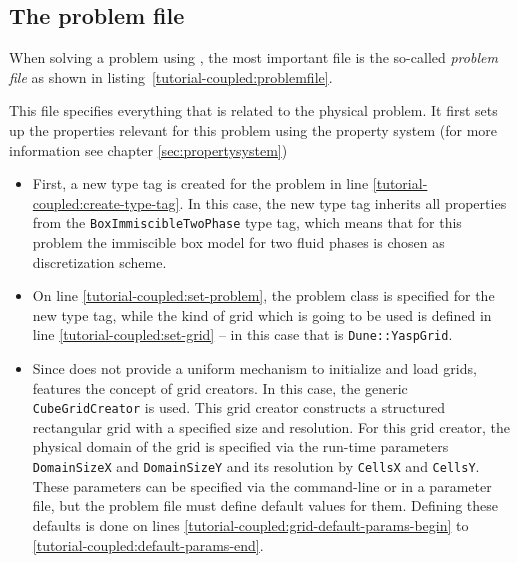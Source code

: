 \subsection{The problem file}

When solving a problem using \eWoms, the most important file is the
so-called \textit{problem file} as shown in
listing~\ref{tutorial-coupled:problemfile}.

\begin{lst}\label{tutorial-coupled:problemfile} \mbox{}

\end{lst}

This file specifies everything that is related to the physical
problem. It first sets up the properties relevant for this problem
using the \eWoms property system (for more information see chapter
\ref{sec:propertysystem})
\begin{itemize}
\item First, a new type tag is created for the problem in line
  \ref{tutorial-coupled:create-type-tag}.  In this case, the new type
  tag inherits all properties from the \texttt{BoxImmiscibleTwoPhase}
  type tag, which means that for this problem the immiscible box model
  for two fluid phases is chosen as discretization scheme.
\item On line \ref{tutorial-coupled:set-problem}, the problem class is
  specified for the new type tag, while the kind of grid which is
  going to be used is defined in line \ref{tutorial-coupled:set-grid}
  -- in this case that is \texttt{Dune::YaspGrid}.
\item Since \Dune does not provide a uniform mechanism to initialize
  and load grids, \eWoms features the concept of grid creators. In
  this case, the generic \texttt{CubeGridCreator} is used. This grid
  creator constructs a structured rectangular grid with a specified
  size and resolution. For this grid creator, the physical domain of
  the grid is specified via the run-time parameters
  \texttt{DomainSizeX} and \texttt{DomainSizeY} and its resolution by
  \texttt{CellsX} and \texttt{CellsY}. These parameters can be
  specified via the command-line or in a parameter file, but the
  problem file must define default values for them. Defining these
  defaults is done on lines
  \ref{tutorial-coupled:grid-default-params-begin} to
  \ref{tutorial-coupled:default-params-end}.
\end{itemize}


